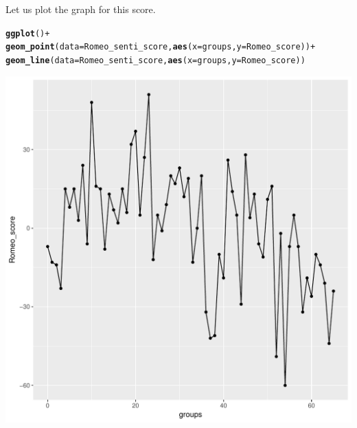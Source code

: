 \documentclass{article}\usepackage[]{graphicx}\usepackage[]{color}
\makeatletter
\def\maxwidth{ %
  \ifdim\Gin@nat@width>\linewidth
    \linewidth
  \else
    \Gin@nat@width
  \fi
}
\newcommand{\hlopt}[1]{\textcolor[rgb]{0,0,0}{#1}}%
\newcommand{\hlstd}[1]{\textcolor[rgb]{0.345,0.345,0.345}{#1}}%
\newcommand{\hlkwc}[1]{\textcolor[rgb]{0.333,0.667,0.333}{#1}}%
\newcommand{\hlkwd}[1]{\textcolor[rgb]{0.737,0.353,0.396}{\textbf{#1}}}%
\newenvironment{kframe}{%
 \def\at@end@of@kframe{}%
 \ifinner\ifhmode%
  \def\at@end@of@kframe{\end{minipage}}%
  \begin{minipage}{\columnwidth}%
 \fi\fi%
 \def\FrameCommand##1{\hskip\@totalleftmargin \hskip-\fboxsep
 \colorbox{shadecolor}{##1}\hskip-\fboxsep
     \hskip-\linewidth \hskip-\@totalleftmargin \hskip\columnwidth}%
 \MakeFramed {\advance\hsize-\width
   \@totalleftmargin\z@ \linewidth\hsize
   \@setminipage}}%
 {\par\unskip\endMakeFramed%
 \at@end@of@kframe}
\newenvironment{knitrout}{}{} %
\makeatother
\begin{document}
Let us plot the graph for this score.
\begin{knitrout}
\color{fgcolor}\begin{kframe}
\begin{alltt}
\hlkwd{ggplot}\hlstd{()}\hlopt{+}
  \hlkwd{geom_point}\hlstd{(}\hlkwc{data}\hlstd{=Romeo_senti_score,}\hlkwd{aes}\hlstd{(}\hlkwc{x}\hlstd{=groups,}\hlkwc{y}\hlstd{=Romeo_score))}\hlopt{+}
  \hlkwd{geom_line}\hlstd{(}\hlkwc{data}\hlstd{=Romeo_senti_score,}\hlkwd{aes}\hlstd{(}\hlkwc{x}\hlstd{=groups,}\hlkwc{y}\hlstd{=Romeo_score))}
\end{alltt}
\end{kframe}
\includegraphics[width=\maxwidth]{figure/unnamed-chunk-16-1} 

\end{knitrout}




\nocite{*}
\end{document}

